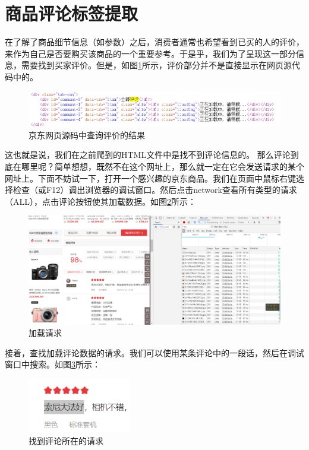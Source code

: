 \section{商品评论标签提取}
在了解了商品细节信息（如参数）之后，消费者通常也希望看到已买的人的评价，来作为自己是否要购买该商品的一个重要参考。于是乎，我们为了呈现这一部分信息，需要找到买家评价。但是，如图\ref{img:yhb1}所示，评价部分并不是直接显示在网页源代码中的。

\begin{figure}[htbp]
\centering
\includegraphics[width=13.5cm]{img/yhb/web_source_code_jd.png}
\caption{京东网页源码中查询评价的结果} %
\label{img:yhb1}   %
\end{figure}

这也就是说，我们在之前爬到的HTML文件中是找不到评论信息的。
那么评论到底在哪里呢？简单想想，既然不在这个网址上，那么就一定在它会发送请求的某个网址上。下面不妨试一下，打开一个感兴趣的京东商品。我们在页面中鼠标右键选择检查（或F12）调出浏览器的调试窗口。然后点击network查看所有类型的请求（ALL），点击评论按钮使其加载数据。如图\ref{img:yhb2}所示：

\begin{figure}[htbp]
\centering
\includegraphics[width=13.5cm]{img/yhb/network_jd.png}
\caption{加载请求} %
\label{img:yhb2}   %
\end{figure}

接着，查找加载评论数据的请求。我们可以使用某条评论中的一段话，然后在调试窗口中搜索。如图\ref{img:yhb3}所示：
\begin{figure}[htbp]
\centering
\includegraphics[width=4.5cm]{img/yhb/find_request_jd.png}
\caption{找到评论所在的请求} %
\label{img:yhb3}   %
\end{figure}

